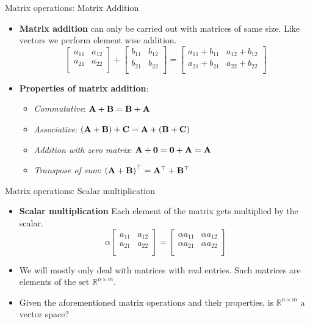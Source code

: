 \documentclass[aspectratio=169]{beamer}
\let\olditem\item
\renewcommand{\item}{\setlength{\itemsep}{\fill}\olditem}
\def\mf{\ensuremath\mathbf}
\begin{document}
\begin{frame}[t]{Matrix operations: Matrix Addition}
\begin{itemize}
\item \textbf{Matrix addition} can only be carried out with matrices of same size. Like vectors we perform element wise addition.
\[ \begin{bmatrix}
a_{11} & a_{12}\\
a_{21} & a_{22}\\
\end{bmatrix} + \begin{bmatrix}
b_{11} & b_{12}\\
b_{21} & b_{22}\\
\end{bmatrix} = \begin{bmatrix}
a_{11} + b_{11} & a_{12} + b_{12}\\
a_{21} + b_{21} & a_{22} + b_{22}\\
\end{bmatrix}\]

\item \textbf{Properties of matrix addition}:
\begin{itemize}
\item \textit{Commutative}: $\mf{A} + \mf{B} = \mf{B} + \mf{A}$
\item \textit{Associative}: $\left(\mf{A} + \mf{B}\right) + \mf{C} = \mf{A} + \left(\mf{B} + \mf{C}\right)$
\item \textit{Addition with zero matrix}: $\mf{A} + \mf{0} = \mf{0} + \mf{A} = \mf{A}$
\item \textit{Transpose of sum}: $\left(\mf{A} + \mf{B}\right)^{\top} = \mf{A}^{\top} + \mf{B}^{\top}$
\end{itemize}
\end{itemize}
\end{frame}

\begin{frame}[t]{Matrix operations: Scalar multiplication}
\begin{itemize}
\item \textbf{Scalar multiplication} Each element of the matrix gets multiplied by the scalar.
\[ \alpha \begin{bmatrix}
a_{11} & a_{12}\\
a_{21} & a_{22}\\
\end{bmatrix} = \begin{bmatrix}
\alpha a_{11} & \alpha a_{12} \\
\alpha a_{21} & \alpha a_{22} \\
\end{bmatrix}\]
\item We will mostly only deal with matrices with real entries. Such matrices are elements of the set $\mathbb{R}^{n\times m}$.
\item Given the aforementioned matrix operations and their properties, is $\mathbb{R}^{n\times m}$ a vector space?
\end{itemize}
\end{frame}
\end{document}
